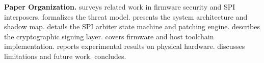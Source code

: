 \noindent\textbf{Paper Organization.}
 surveys related work in firmware security and \ac{SPI} interposers.  formalizes the threat model.  presents the system architecture and shadow map.  details the \ac{SPI} arbiter state machine and patching engine.  describes the cryptographic signing layer.  covers firmware and host toolchain implementation.  reports experimental results on physical hardware.  discusses limitations and future work.  concludes.